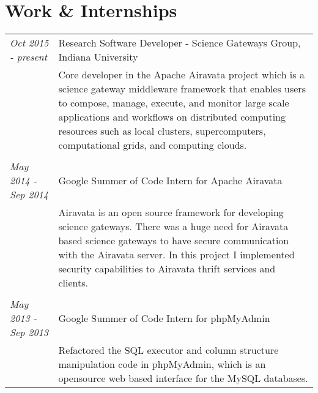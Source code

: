 \documentclass[a4paper,10pt]{article}
\begin{document}
\section{Work \& Internships}
\begin{tabular}{p{3cm}|p{13.5cm}}

\emph{Oct 2015 - present}& Research Software Developer - Science Gateways Group, Indiana University\\
&\footnotesize{Core developer in the Apache Airavata project which is a science gateway middleware framework that enables users to compose, manage, execute, and monitor large scale applications and workflows on distributed computing resources such as local clusters, supercomputers, computational grids, and computing clouds.}\\\\

\emph{May 2014 - Sep 2014}& Google Summer of Code Intern for Apache Airavata\\
&\footnotesize{Airavata is an open source framework for developing science gateways. There was a huge need for Airavata based science gateways to have secure communication with the Airavata server. In this project I implemented security capabilities to Airavata thrift services and clients.}\\\\



\emph{May 2013 - Sep 2013} & Google Summer of Code Intern for phpMyAdmin 
\\&\footnotesize{Refactored the SQL executor and column structure manipulation code in phpMyAdmin, which is an opensource web based interface for the MySQL databases.}
\end{tabular}\\\\
\end{document}
